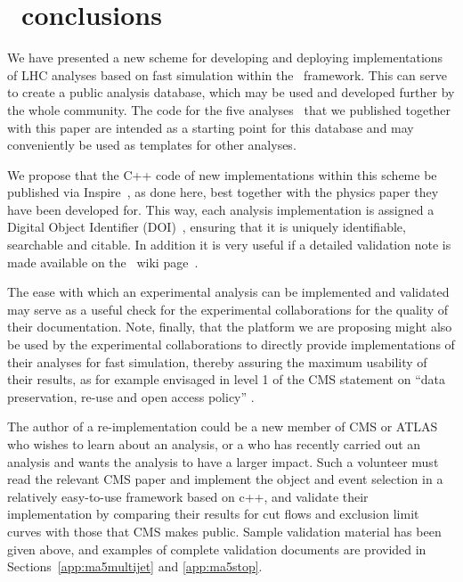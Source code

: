 
\section{\ma\ conclusions}\label{sec:conclusions}


We have presented a new scheme for developing and deploying implementations of LHC analyses 
based on fast simulation within the \ma\ framework. This can serve to create a public analysis database,  
which may be used and developed further by the whole community.  
The code for the five analyses~\cite{MA5-CMS-SUS-13-011,MA5-CMS-SUS-13-012,MA5-CMS-SUS-13-016,MA5-ATLAS-SUSY-2013-05,MA5-ATLAS-SUSY-2013-11} 
that we published together with this paper are intended as a starting point 
for this database and may conveniently be used as templates for other analyses.  

We propose that the C++ code of new implementations within this scheme be published 
via {\sc Inspire}~\cite{inspire}, as done here,  
best together with the physics paper they have been developed for. 
This way, each analysis implementation is assigned a 
Digital Object Identifier (DOI)~\cite{doi}, ensuring that it is uniquely identifiable, searchable and citable. 
In addition it is very useful if a detailed validation note is made available on the  \ma\ wiki page~\cite{ma5wiki}. 

The ease with which an experimental analysis can be implemented and validated may serve as a useful check for the experimental collaborations for the quality of their documentation. Note, finally, that the platform we are pro\-posing might also be used by the experimental collaborations to directly provide implementations of their analyses for fast simulation, thereby assuring the maximum usability of their results, as for example envisaged in level 1 of the CMS statement on ``data preservation, re-use and open access policy'' \cite{CMS:DataPolicy}. 

The author of a re-implementation could be a new member of CMS or ATLAS who wishes to learn about an analysis, or a who has recently carried out an analysis and wants the analysis to have a larger impact. Such a volunteer must read the relevant CMS paper and implement the object and event selection in a relatively easy-to-use framework based on c++, and validate their implementation by comparing their results for cut flows and exclusion limit curves with those that CMS makes public. Sample validation material has been given above, and examples of complete validation documents are provided in Sections~\ref{app:ma5multijet} and \ref{app:ma5stop}.

